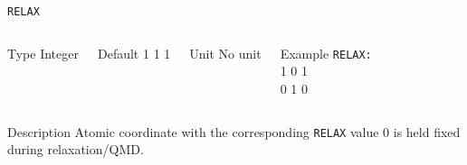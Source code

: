 \begin{frame}[allowframebreaks]{\texttt{RELAX}} \label{RELAX}
\vspace*{-12pt}
\begin{columns}
\begin{block}{Type}
Integer
\end{block}

\begin{block}{Default}
1 1 1
\end{block}

\begin{block}{Unit}
No unit
\end{block}

\begin{block}{Example}
\texttt{RELAX: \\}
1 0 1 \\
0 1 0
\end{block}
\end{columns}

\begin{block}{Description}
Atomic coordinate with the corresponding \texttt{RELAX} value 0 is held fixed during relaxation/QMD.
\end{block}

\end{frame}


